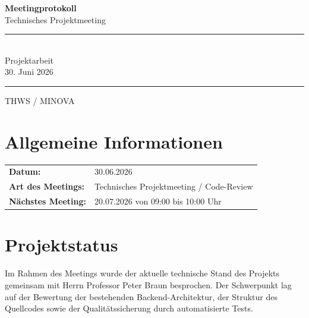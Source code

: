 \documentclass[a4paper,11pt]{article}
\begin{document}

\begin{titlepage}
    \centering

    \vspace*{3cm}

    {\Huge \textbf{Meetingprotokoll}}\\[0.5cm]
    {\Large Technisches Projektmeeting}\\[2cm]

    \rule{12cm}{0.5pt}\\[0.5cm]

    {\Large Projektarbeit}\\[0.3cm]
    {\large 30. Juni 2026}

    \rule{12cm}{0.5pt}

    \vfill

    {\large THWS / MINOVA}\\

\end{titlepage}


\tableofcontents
\newpage


\section{Allgemeine Informationen}

\begin{tabular}{ll}
\textbf{Datum:} & 30.06.2026 \\
\textbf{Art des Meetings:} & Technisches Projektmeeting / Code-Review \\
\textbf{Nächstes Meeting:} & 20.07.2026 von 09:00 bis 10:00 Uhr \\
\end{tabular}

\vspace{1cm}

\section{Projektstatus}

Im Rahmen des Meetings wurde der aktuelle technische Stand des Projekts gemeinsam mit Herrn Professor Peter Braun besprochen. Der Schwerpunkt lag auf der Bewertung der bestehenden Backend-Architektur, der Struktur des Quellcodes sowie der Qualitätssicherung durch automatisierte Tests.
\end{document}
